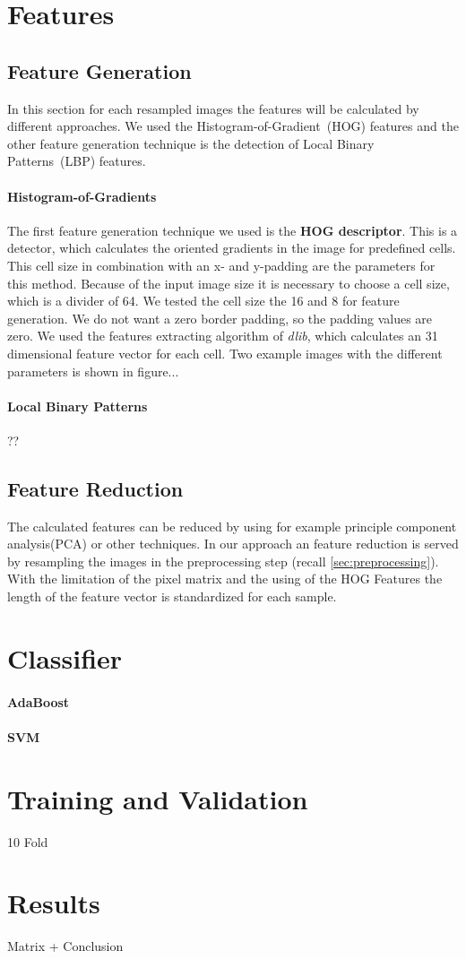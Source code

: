 \documentclass[a4paper,10pt]{article}
\begin{document}
\section{Features}
\subsection{Feature Generation}

In this section for each resampled images the features will be calculated by different approaches.
We used the Histogram-of-Gradient~(HOG) features and the other feature generation technique is the detection of Local Binary Patterns~(LBP) features.
\paragraph{Histogram-of-Gradients}

The first feature generation technique we used is the \textbf{HOG descriptor}.
This is a detector, which calculates the oriented gradients in the image for predefined cells. 
This cell size in combination with an x- and y-padding are the parameters for this method.
Because of the input image size it is necessary to choose a cell size, which is a divider of 64. 
We tested the cell size the 16 and 8 for feature generation. We do not want a zero border padding, so the padding values are zero. 
We used the features extracting algorithm of \emph{dlib}, which calculates an 31 dimensional feature vector for each cell.
Two example images with the different parameters is shown in figure...
\paragraph{Local Binary Patterns}
??

\subsection{Feature Reduction}

The calculated features can be reduced by using for example principle component analysis(PCA) or other techniques.
In our approach an feature reduction is served by resampling the images in the preprocessing step (recall \autoref{sec:preprocessing}).
With the limitation of the pixel matrix and the using of the HOG Features the length of the feature vector is standardized for each sample.

\section{Classifier}
\paragraph{AdaBoost}
\paragraph{SVM}

\section{Training and Validation}
10 Fold

\section{Results}
Matrix + Conclusion 
\end{document}
